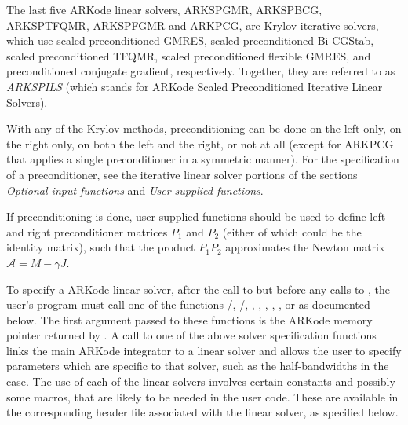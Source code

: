 \documentclass[letterpaper,10pt,english]{sphinxmanual}
\begin{document}
The last five ARKode linear solvers, ARKSPGMR, ARKSPBCG, ARKSPTFQMR,
ARKSPFGMR and ARKPCG, are Krylov iterative solvers, which use scaled
preconditioned GMRES, scaled preconditioned Bi-CGStab, scaled
preconditioned TFQMR, scaled preconditioned flexible GMRES, and
preconditioned conjugate gradient, respectively.  Together, they are
referred to as \emph{ARKSPILS} (which stands for ARKode Scaled
Preconditioned Iterative Linear Solvers).

With any of the Krylov methods, preconditioning can be done on the
left only, on the right only, on both the left and the right, or not
at all (except for ARKPCG that applies a single preconditioner in a
symmetric manner). For the specification of a preconditioner, see the
iterative linear solver portions of the sections
{\hyperref[c_interface/User_callable:cinterface-optionalinputs]{\emph{Optional input functions}}} and {\hyperref[c_interface/User_supplied:cinterface-usersupplied]{\emph{User-supplied functions}}}.

If preconditioning is done, user-supplied functions should be used to
define left and right preconditioner matrices $P_1$ and
$P_2$ (either of which could be the identity matrix), such that
the product $P_{1}P_{2}$ approximates the Newton matrix
${\mathcal A} = M - \gamma J$.

To specify a ARKode linear solver, after the call to
{\hyperref[c_interface/User_callable:ARKodeCreate]{}} but before any calls to {\hyperref[c_interface/User_callable:ARKode]{}},
the user's program must call one of the functions
{\hyperref[c_interface/User_callable:ARKDense]{}}/{\hyperref[c_interface/User_callable:ARKLapackDense]{}},
{\hyperref[c_interface/User_callable:ARKBand]{}}/{\hyperref[c_interface/User_callable:ARKLapackBand]{}},
{\hyperref[c_interface/User_callable:ARKKLU]{}}, {\hyperref[c_interface/User_callable:ARKSuperLUMT]{}},
{\hyperref[c_interface/User_callable:ARKSpgmr]{}}, {\hyperref[c_interface/User_callable:ARKSpbcg]{}}, {\hyperref[c_interface/User_callable:ARKSptfqmr]{}},
{\hyperref[c_interface/User_callable:ARKSpfgmr]{}} or {\hyperref[c_interface/User_callable:ARKPcg]{}} as documented below. The
first argument passed to these functions is the ARKode memory pointer
returned by {\hyperref[c_interface/User_callable:ARKodeCreate]{}}.  A call to one of the above
solver specification functions links the main ARKode integrator to a
linear solver and allows the user to specify parameters which are
specific to that solver, such as the half-bandwidths in the
{\hyperref[c_interface/User_callable:ARKBand]{}} case.  The use of each of the linear solvers
involves certain constants and possibly some macros, that are likely
to be needed in the user code. These are available in the
corresponding header file associated with the linear solver, as
specified below.
\end{document}
